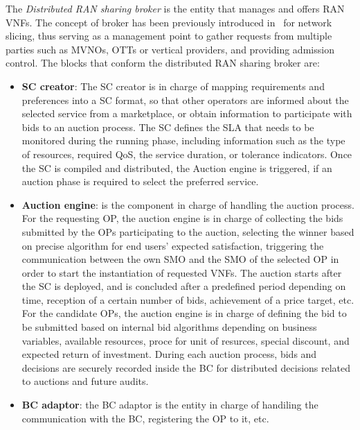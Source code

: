 \documentclass[journal]{IEEEtran}
\begin{document}
The \textit{Distributed RAN sharing broker} is the entity that manages and offers RAN VNFs. The concept of broker has been previously introduced in~\cite{samdanis2016network} for network slicing, thus serving as a management point to gather requests from multiple parties such as MVNOs, OTTs or vertical providers, and providing admission control. The blocks that conform the distributed RAN sharing broker are:
\begin{itemize}
    \item \textbf{SC creator}: The SC creator is in charge of mapping requirements and preferences into a SC format, so that other operators are informed about the selected service from a marketplace, or obtain information to participate with bids to an auction process. The SC defines the SLA that needs to be monitored during the running phase, including information such as the type of resources, required QoS, the service duration, or tolerance indicators. Once the SC is compiled and distributed, the Auction engine is triggered, if an auction phase is required to select the preferred service.
    \item \textbf{Auction engine}: is the component in charge of handling the auction process. For the requesting OP, the auction engine is in charge of collecting the bids submitted by the OPs participating to the auction, selecting the winner based on precise algorithm for end users' expected satisfaction, triggering the communication between the own SMO and the SMO of the selected OP in order to start the instantiation of requested VNFs. The auction starts after the SC is deployed, and is concluded after a predefined period depending on time, reception of a certain number of bids, achievement of a price target, etc. For the candidate OPs, the auction engine is in charge of defining the bid to be submitted based on internal bid algorithms depending on business variables, available resources, proce for unit of resurces, special discount, and expected return of investment. During each auction process, bids and decisions are securely recorded inside the BC for distributed decisions related to auctions and future audits.
    \item \textbf{BC adaptor}: the BC adaptor is the entity in charge of handiling the communication with the BC, registering the OP to it, etc.
\end{itemize}
\end{document}
